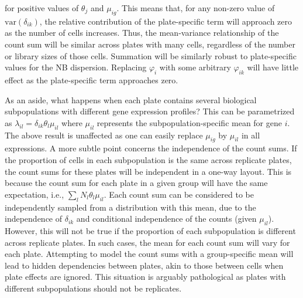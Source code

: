 \documentclass{article}
\begin{document}
for positive values of $\theta_j$ and $\mu_{ig}$.
This means that, for any non-zero value of $\mbox{var}(\delta_{ik})$, the relative contribution of the plate-specific term will approach zero as the number of cells increases.
Thus, the mean-variance relationship of the count sum will be similar across plates with many cells, regardless of the number or library sizes of those cells.
Summation will be similarly robust to plate-specific values for the NB dispersion.
Replacing $\varphi_i$ with some arbitrary $\varphi_{ik}$ will have little effect as the plate-specific term approaches zero.



As an aside, what happens when each plate contains several biological subpopulations with different gene expression profiles?
This can be parametrized as $\lambda_{il} = \delta_{ik} \theta_l \mu_{il}$ where $\mu_{il}$ represents the subpopulation-specific mean for gene $i$.
The above result is unaffected as one can easily replace $\mu_{ig}$ by $\mu_{il}$ in all expressions.
A more subtle point concerns the independence of the count sums.
If the proportion of cells in each subpopulation is the same across replicate plates, the count sums for these plates will be independent in a one-way layout.
This is because the count sum for each plate in a given group will have the same expectation, i.e., $\sum_l N_l\theta_l \mu_{il}$.
Each count sum can be considered to be independently sampled from a distribution with this mean, due to the independence of $\delta_{ik}$ and conditional independence of the counts (given $\mu_{il}$).
However, this will not be true if the proportion of each subpopulation is different across replicate plates.
In such cases, the mean for each count sum will vary for each plate.
Attempting to model the count sums with a group-specific mean will lead to hidden dependencies between plates, akin to those between cells when plate effects are ignored.
This situation is arguably pathological as plates with different subpopulations should not be replicates.
\end{document}
